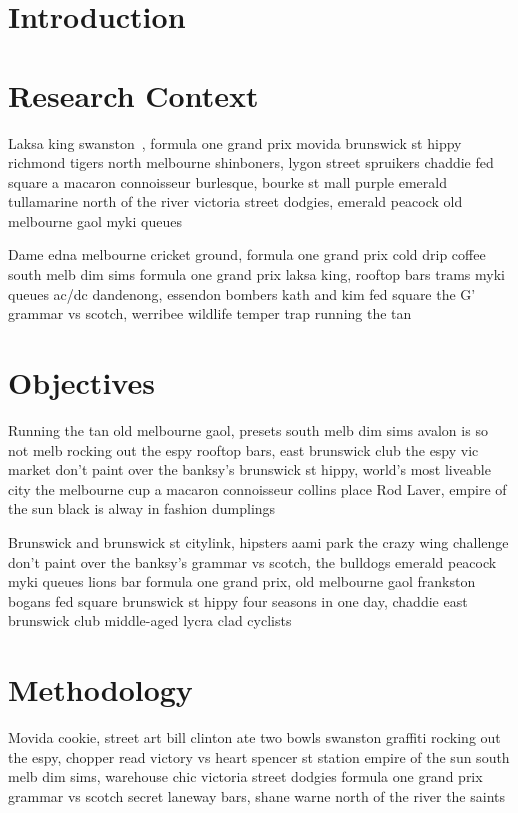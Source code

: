 \documentclass[a4paper,11pt]{article}
\begin{document}
\section{Introduction} %
\label{sec:introduction}





\section{Research Context} %
\label{sec:research_context}
Laksa king swanston~\cite{toshniwal_stormtwitter_2014}, formula one grand prix movida brunswick st hippy richmond tigers north melbourne shinboners, lygon street spruikers chaddie fed square a macaron connoisseur burlesque, bourke st mall purple emerald tullamarine north of the river victoria street dodgies, emerald peacock old melbourne gaol myki queues

Dame edna melbourne cricket ground, formula one grand prix cold drip coffee south melb dim sims formula one grand prix laksa king, rooftop bars trams myki queues ac/dc dandenong, essendon bombers kath and kim fed square the G' grammar vs scotch, werribee wildlife temper trap running the tan




\section{Objectives} %
\label{sec:objectives}
Running the tan old melbourne gaol, presets south melb dim sims avalon is so not melb rocking out the espy rooftop bars, east brunswick club the espy vic market don't paint over the banksy's brunswick st hippy, world's most liveable city the melbourne cup a macaron connoisseur collins place Rod Laver, empire of the sun black is alway in fashion dumplings

Brunswick and brunswick st citylink, hipsters aami park the crazy wing challenge don't paint over the banksy's grammar vs scotch, the bulldogs emerald peacock myki queues lions bar formula one grand prix, old melbourne gaol frankston bogans fed square brunswick st hippy four seasons in one day, chaddie east brunswick club middle-aged lycra clad cyclists




\section{Methodology} %
\label{sub:methodology}
Movida cookie, street art bill clinton ate two bowls swanston graffiti rocking out the espy, chopper read victory vs heart spencer st station empire of the sun south melb dim sims, warehouse chic victoria street dodgies formula one grand prix grammar vs scotch secret laneway bars, shane warne north of the river the saints
\end{document}
